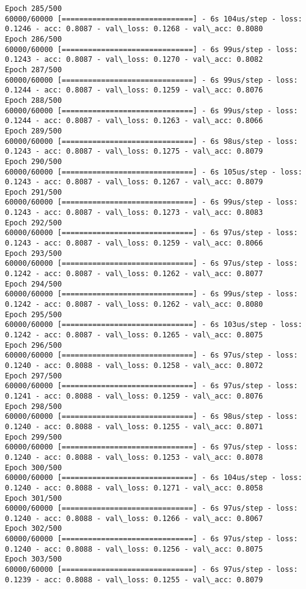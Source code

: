 \documentclass[11pt]{article}
\begin{document}
\begin{Verbatim}[commandchars=\\\{\}]
Epoch 285/500
60000/60000 [==============================] - 6s 104us/step - loss: 0.1246 - acc: 0.8087 - val\_loss: 0.1268 - val\_acc: 0.8080
Epoch 286/500
60000/60000 [==============================] - 6s 99us/step - loss: 0.1243 - acc: 0.8087 - val\_loss: 0.1270 - val\_acc: 0.8082
Epoch 287/500
60000/60000 [==============================] - 6s 99us/step - loss: 0.1244 - acc: 0.8087 - val\_loss: 0.1259 - val\_acc: 0.8076
Epoch 288/500
60000/60000 [==============================] - 6s 99us/step - loss: 0.1244 - acc: 0.8087 - val\_loss: 0.1263 - val\_acc: 0.8066
Epoch 289/500
60000/60000 [==============================] - 6s 98us/step - loss: 0.1243 - acc: 0.8087 - val\_loss: 0.1275 - val\_acc: 0.8079
Epoch 290/500
60000/60000 [==============================] - 6s 105us/step - loss: 0.1243 - acc: 0.8087 - val\_loss: 0.1267 - val\_acc: 0.8079
Epoch 291/500
60000/60000 [==============================] - 6s 99us/step - loss: 0.1243 - acc: 0.8087 - val\_loss: 0.1273 - val\_acc: 0.8083
Epoch 292/500
60000/60000 [==============================] - 6s 97us/step - loss: 0.1243 - acc: 0.8087 - val\_loss: 0.1259 - val\_acc: 0.8066
Epoch 293/500
60000/60000 [==============================] - 6s 97us/step - loss: 0.1242 - acc: 0.8087 - val\_loss: 0.1262 - val\_acc: 0.8077
Epoch 294/500
60000/60000 [==============================] - 6s 99us/step - loss: 0.1242 - acc: 0.8087 - val\_loss: 0.1262 - val\_acc: 0.8080
Epoch 295/500
60000/60000 [==============================] - 6s 103us/step - loss: 0.1242 - acc: 0.8087 - val\_loss: 0.1265 - val\_acc: 0.8075
Epoch 296/500
60000/60000 [==============================] - 6s 97us/step - loss: 0.1240 - acc: 0.8088 - val\_loss: 0.1258 - val\_acc: 0.8072
Epoch 297/500
60000/60000 [==============================] - 6s 97us/step - loss: 0.1241 - acc: 0.8088 - val\_loss: 0.1259 - val\_acc: 0.8076
Epoch 298/500
60000/60000 [==============================] - 6s 98us/step - loss: 0.1240 - acc: 0.8088 - val\_loss: 0.1255 - val\_acc: 0.8071
Epoch 299/500
60000/60000 [==============================] - 6s 97us/step - loss: 0.1240 - acc: 0.8088 - val\_loss: 0.1253 - val\_acc: 0.8078
Epoch 300/500
60000/60000 [==============================] - 6s 104us/step - loss: 0.1240 - acc: 0.8088 - val\_loss: 0.1271 - val\_acc: 0.8058
Epoch 301/500
60000/60000 [==============================] - 6s 97us/step - loss: 0.1240 - acc: 0.8088 - val\_loss: 0.1266 - val\_acc: 0.8067
Epoch 302/500
60000/60000 [==============================] - 6s 97us/step - loss: 0.1240 - acc: 0.8088 - val\_loss: 0.1256 - val\_acc: 0.8075
Epoch 303/500
60000/60000 [==============================] - 6s 97us/step - loss: 0.1239 - acc: 0.8088 - val\_loss: 0.1255 - val\_acc: 0.8079

\end{Verbatim}
\end{document}
